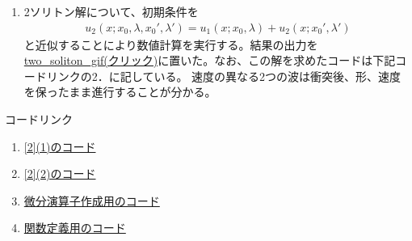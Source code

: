 \documentclass[a4j, dvipdfmx]{jarticle}
\begin{document}
\begin{enumerate}[(1)]
  \item 2ソリトン解について、初期条件を
        \begin{align}
          u_2(x; x_0, \lambda, x_0', \lambda')=u_1(x; x_0, \lambda) + u_2(x; x_0', \lambda')
        \end{align}
        と近似することにより数値計算を実行する。結果の出力を\href{https://github.com/eri61/computer_physics/blob/14950abad1236061aca284cfe7e84c19b70c081b/submit/report2/out/solve_two_soliton.gif}{two\_soliton\_gif(クリック)}に置いた。なお、この解を求めたコードは下記コードリンクの2．に記している。
        速度の異なる2つの波は衝突後、形、速度を保ったまま進行することが分かる。

\end{enumerate}
\Large コードリンク
\normalsize
\begin{enumerate}
  \item \href{https://github.com/eri61/computer_physics/blob/main/submit/report2/code/report2_pr1.ipynb}{[2](1)のコード}
  \item \href{https://github.com/eri61/computer_physics/blob/6478851b2b60323078073526861c761479416ca9/submit/report2/code/report2_pr2.ipynb}{[2](2)のコード}
  \item \href{https://github.com/eri61/computer_physics/blob/main/submit/report2/code/differential.py}{微分演算子作成用のコード}
  \item \href{https://github.com/eri61/computer_physics/blob/6478851b2b60323078073526861c761479416ca9/submit/report2/code/equation.py}{関数定義用のコード}
\end{enumerate}
\end{document}
